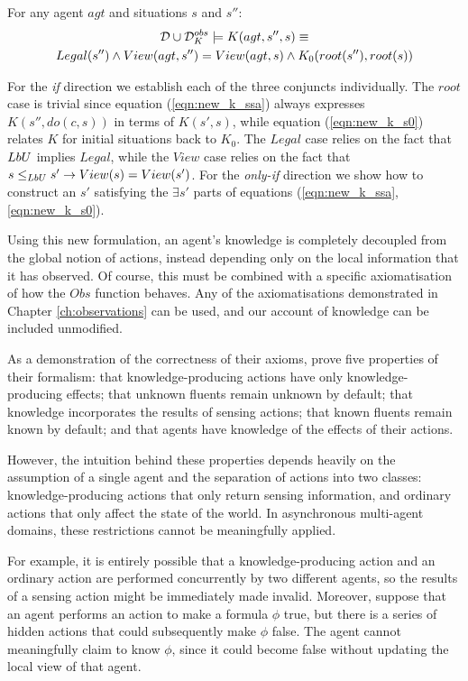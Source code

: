 \begin{thm}
\label{thm:k_obs_equiv} For any agent $agt$ and situations $s$
and $s''$:\begin{multline*}
\mathcal{D}\cup\mathcal{D}_{K}^{obs}\models K(agt,s'',s)\equiv\\
Legal(s'')\wedge View(agt,s'')=View(agt,s)\wedge K_{0}(root(s''),root(s))\end{multline*}

\end{thm}
\begin{proofsketch}
For the \emph{if} direction we establish each of the three conjuncts
individually. The $root$ case is trivial since equation (\ref{eqn:new_k_ssa})
always expresses $K(s'',do(c,s))$ in terms of $K(s',s)$, while equation
(\ref{eqn:new_k_s0}) relates $K$ for initial situations back to
$K_{0}$. The $Legal$ case relies on the fact that $LbU$ implies
$Legal$, while the $View$ case relies on the fact that $s\leq_{LbU}s'\rightarrow View(s)=View(s')$.
For the \emph{only-if} direction we show how to construct an $s'$
satisfying the $\exists s'$ parts of equations (\ref{eqn:new_k_ssa},\ref{eqn:new_k_s0}). 
\end{proofsketch}
Using this new formulation, an agent's knowledge is completely decoupled
from the global notion of actions, instead depending only on the local
information that it has observed. Of course, this must be combined
with a specific axiomatisation of how the $Obs$ function behaves.
Any of the axiomatisations demonstrated in Chapter \ref{ch:observations}
can be used, and our account of knowledge can be included unmodified.

As a demonstration of the correctness of their axioms, \citet{scherl03sc_knowledge}
prove five properties of their formalism: that knowledge-producing
actions have only knowledge-producing effects; that unknown fluents
remain unknown by default; that knowledge incorporates the results
of sensing actions; that known fluents remain known by default; and
that agents have knowledge of the effects of their actions.

However, the intuition behind these properties depends heavily on
the assumption of a single agent and the separation of actions into
two classes: knowledge-producing actions that only return sensing
information, and ordinary actions that only affect the state of the
world. In asynchronous multi-agent domains, these restrictions cannot
be meaningfully applied.

For example, it is entirely possible that a knowledge-producing action
and an ordinary action are performed concurrently by two different
agents, so the results of a sensing action might be immediately made
invalid. Moreover, suppose that an agent performs an action to make
a formula $\phi$ true, but there is a series of hidden actions that
could subsequently make $\phi$ false. The agent cannot meaningfully
claim to know $\phi$, since it could become false without updating
the local view of that agent.

